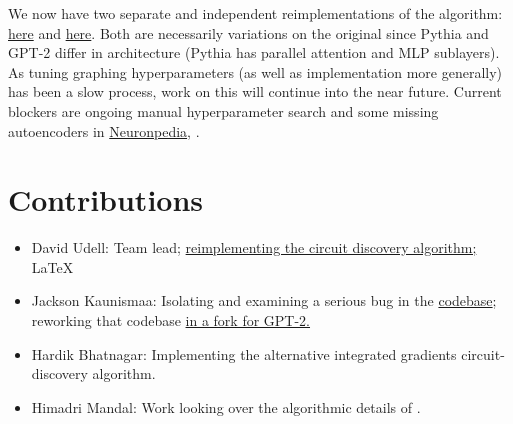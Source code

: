 \documentclass[10pt]{article}
\begin{document}
We now have two separate and independent reimplementations of the \citet{Marks2024} algorithm: \href{https://github.com/DavidUdell/sparse_circuit_discovery}{here} and \href{https://github.com/JacksonKaunismaa/feature-circuits/tree/jvp-fix}{here}. Both are necessarily variations on the original since Pythia and GPT-2 differ in architecture (Pythia has parallel attention and MLP sublayers). As tuning graphing hyperparameters (as well as implementation more generally) has been a slow process, work on this will continue into the near future. Current blockers are ongoing manual hyperparameter search and some missing autoencoders in \href{https://www.neuronpedia.org/}{Neuronpedia}, \citep{neuronpedia}.


\section*{Contributions}
\begin{itemize}
\item David Udell: Team lead; \href{https://github.com/DavidUdell/sparse_circuit_discovery}{reimplementing the circuit discovery algorithm;} \LaTeX
\item Jackson Kaunismaa: Isolating and examining a serious bug in the \citet{Marks2024} \href{https://github.com/saprmarks/feature-circuits}{codebase}; reworking that codebase \href{https://github.com/JacksonKaunismaa/feature-circuits/tree/jvp-fix}{in a fork for GPT-2.}
\item Hardik Bhatnagar: Implementing the alternative integrated gradients circuit-discovery algorithm.
\item Himadri Mandal: Work looking over the algorithmic details of \citet{Marks2024}.
\end{itemize}



\end{document}
